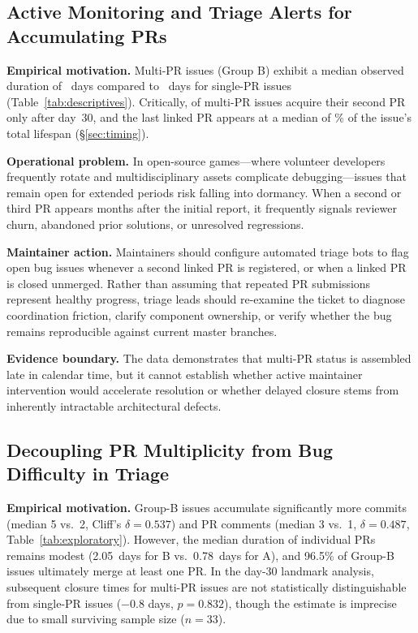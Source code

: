\subsection{Active Monitoring and Triage Alerts for Accumulating PRs}
\textbf{Empirical motivation.} Multi-PR issues (Group B) exhibit a median observed duration of \valmedB{}~days compared to \valmedA{}~days for single-PR issues (Table~\ref{tab:descriptives}). Critically, \vallmShareB{} of multi-PR issues acquire their second PR only after day~30, and the last linked PR appears at a median of \valtMedLast\% of the issue's total lifespan (\S\ref{sec:timing}).

\textbf{Operational problem.} In open-source games—where volunteer developers frequently rotate and multidisciplinary assets complicate debugging—issues that remain open for extended periods risk falling into dormancy. When a second or third PR appears months after the initial report, it frequently signals reviewer churn, abandoned prior solutions, or unresolved regressions.

\textbf{Maintainer action.} Maintainers should configure automated triage bots to flag open bug issues whenever a second linked PR is registered, or when a linked PR is closed unmerged. Rather than assuming that repeated PR submissions represent healthy progress, triage leads should re-examine the ticket to diagnose coordination friction, clarify component ownership, or verify whether the bug remains reproducible against current master branches.

\textbf{Evidence boundary.} The data demonstrates that multi-PR status is assembled late in calendar time, but it cannot establish whether active maintainer intervention would accelerate resolution or whether delayed closure stems from inherently intractable architectural defects.

\subsection{Decoupling PR Multiplicity from Bug Difficulty in Triage}
\textbf{Empirical motivation.} Group-B issues accumulate significantly more commits (median 5 vs.\ 2, Cliff's $\delta=0.537$) and PR comments (median 3 vs.\ 1, $\delta=0.487$, Table~\ref{tab:exploratory}). However, the median duration of individual PRs remains modest (2.05~days for B vs.\ 0.78~days for A), and 96.5\% of Group-B issues ultimately merge at least one PR. In the day-30 landmark analysis, subsequent closure times for multi-PR issues are not statistically distinguishable from single-PR issues ($-0.8$ days, $p=0.832$), though the estimate is imprecise due to small surviving sample size ($n=33$).

